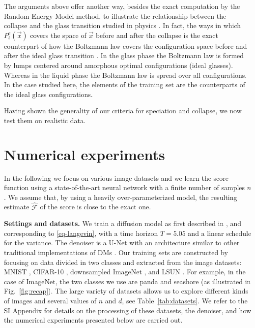\documentclass[10pt,twocolumn]{article}
\newcommand{\vx}{\vec x}
\begin{document}
The arguments above offer another way, besides the exact computation by the Random Energy Model method, to illustrate the relationship between the collapse and the glass transition studied in physics \cite{berthier2011theoretical}. In fact, the ways in which $P^e_t(\vx)$ covers the space of $\vx$ before and after the collapse is the exact counterpart of how the Boltzmann law covers the configuration space before and after the ideal glass transition \cite{berthier2011theoretical}. In the glass phase the Boltzmann law is formed by lumps centered around amorphous optimal configurations (ideal glasses). Whereas in the liquid phase the Boltzmann law is spread over all configurations.
In the case studied here, the elements of the training set are the counterparts of the ideal glass configurations.  



Having shown the generality of our criteria for speciation and collapse, we now test them on realistic data. 

\section*{Numerical experiments}
In the following we focus on various image datasets and we learn the score function using a state-of-the-art neural network with a finite number of samples $n$. We assume that, by using a heavily over-parameterized model, the resulting estimate $\hat{\mathcal{F}}$ of the score is close to the exact one.

{\bf Settings and datasets.} We train a diffusion model as first described in \cite{Ho2020}, and corresponding to \eqref{eq-langevin}, with a time horizon $T = 5.05$ and a linear schedule for the variance. The denoiser is a U-Net \cite{Ronneberger2015_unet} with an architecture similar to other traditional implementations of DMs \cite{Ho2020, song2020denoising, ambrogioni}. Our training sets are constructed by focusing on data divided in two classes and extracted from the image datasets: MNIST \cite{Lecun1998}, CIFAR-10 \cite{Krizhevsky2009_CIFAR}, downsampled ImageNet \cite{Chrabaszcz2017_Imagenet_downsampled}, and LSUN \cite{Yu2015_LSUN}. For example, in the case of ImageNet, the two classes we use are panda and seashore (as illustrated in Fig.~\ref{fig:recap}). The large variety of datasets allows us to explore different kinds of images and several values of $n$ and $d$, see Table~\ref{tab:datasets}. We refer to the SI Appendix for details on the processing of these datasets, the denoiser, and how the numerical experiments presented below are carried out.
\end{document}
